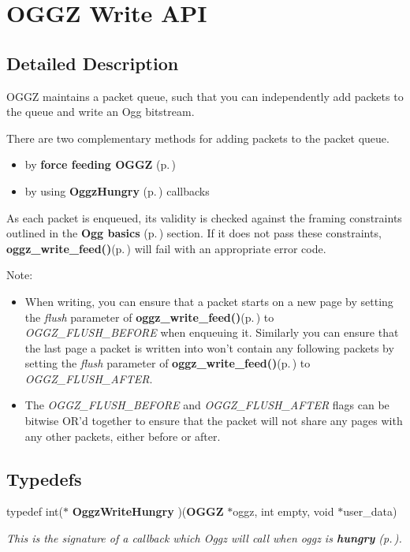 \section{OGGZ Write API}
\label{group__write__api}


\subsection{Detailed Description}
OGGZ maintains a packet queue, such that you can independently add packets to the queue and write an Ogg bitstream. 

There are two complementary methods for adding packets to the packet queue.

\begin{itemize}
\item by {\bf force feeding OGGZ }{\rm (p.\,\pageref{group__force__feed})}\item by using {\bf Oggz\-Hungry }{\rm (p.\,\pageref{group__hungry})} callbacks\end{itemize}


As each packet is enqueued, its validity is checked against the framing constraints outlined in the {\bf Ogg basics }{\rm (p.\,\pageref{group__basics})} section. If it does not pass these constraints, {\bf oggz\_\-write\_\-feed()}{\rm (p.\,\pageref{group__write__api_a2})} will fail with an appropriate error code.

\begin{Desc}
\item[Note:]\begin{itemize}
\item When writing, you can ensure that a packet starts on a new page by setting the {\em flush\/} parameter of {\bf oggz\_\-write\_\-feed()}{\rm (p.\,\pageref{group__write__api_a2})} to {\em OGGZ\_\-FLUSH\_\-BEFORE\/} when enqueuing it. Similarly you can ensure that the last page a packet is written into won't contain any following packets by setting the {\em flush\/} parameter of {\bf oggz\_\-write\_\-feed()}{\rm (p.\,\pageref{group__write__api_a2})} to {\em OGGZ\_\-FLUSH\_\-AFTER\/}.\item The {\em OGGZ\_\-FLUSH\_\-BEFORE\/} and {\em OGGZ\_\-FLUSH\_\-AFTER\/} flags can be bitwise OR'd together to ensure that the packet will not share any pages with any other packets, either before or after. \end{itemize}
\end{Desc}


\subsection*{Typedefs}
\begin{CompactItemize}
\item 
typedef int($\ast$ {\bf Oggz\-Write\-Hungry} )({\bf OGGZ} $\ast$oggz, int empty, void $\ast$user\_\-data)
\begin{CompactList}\small\item\em This is the signature of a callback which Oggz will call when {\em oggz\/} is {\bf hungry }{\rm (p.\,\pageref{group__hungry})}. \item\end{CompactList}\end{CompactItemize}
